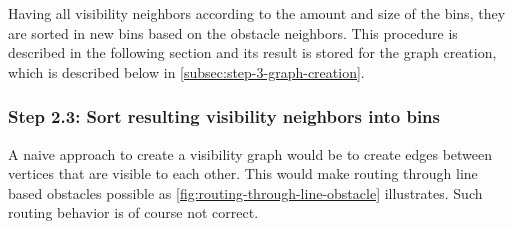 			Having all visibility neighbors according to the amount and size of the bins, they are sorted in new bins based on the obstacle neighbors.
			This procedure is described in the following section and its result is stored for the graph creation, which is described below in \cref{subsec:step-3-graph-creation}.
		
		\subsubsection{Step 2.3: Sort resulting visibility neighbors into bins}
		
			A naive approach to create a visibility graph would be to create edges between vertices that are visible to each other.
			This would make routing through line based obstacles possible as \cref{fig:routing-through-line-obstacle} illustrates.
			Such routing behavior is of course not correct.
			
